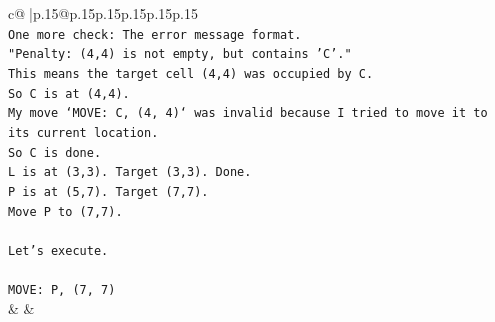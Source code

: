 \documentclass{article}
\begin{document}
{\begin{supertabular}{c@{$\;$}|p{.15\linewidth}@{}p{.15\linewidth}p{.15\linewidth}p{.15\linewidth}p{.15\linewidth}p{.15\linewidth}}
{{{\\ 
\texttt{One more check: The error message format.} \\
\texttt{"Penalty: (4,4) is not empty, but contains 'C'."} \\
\texttt{This means the target cell (4,4) was occupied by C.} \\
\texttt{So C is at (4,4).} \\
\texttt{My move `MOVE: C, (4, 4)` was invalid because I tried to move it to its current location.} \\
\texttt{So C is done.} \\
\texttt{L is at (3,3). Target (3,3). Done.} \\
\texttt{P is at (5,7). Target (7,7).} \\
\texttt{Move P to (7,7).} \\
\\ 
\texttt{Let's execute.} \\
\\ 
\texttt{MOVE: P, (7, 7)} \\
            }
        }
    }
    & & \\ \\


\end{supertabular}}
\end{document}
